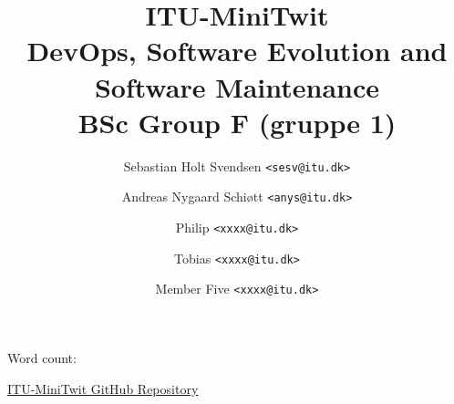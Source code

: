 \documentclass[a4paper,11pt]{article}
\title{
    \textbf{ITU-MiniTwit} \\[0.5em]
    \large DevOps, Software Evolution and Software Maintenance \\
    BSc Group F (gruppe 1)
}
\author{
    Sebastian Holt Svendsen \texttt{<sesv@itu.dk>} \and 
    Andreas Nygaard Schiøtt \texttt{<anys@itu.dk>} \and
    Philip \texttt{<xxxx@itu.dk>} \and
    Tobias \texttt{<xxxx@itu.dk>} \and
    Member Five \texttt{<xxxx@itu.dk>}
}
\begin{document}
\immediate{}

\maketitle
\begin{center}
    \small Word count: \wordcount
\end{center}


\tableofcontents
\vspace{1cm}
\begin{center}
 \href{https://github.com/sebseb10/ITU-MiniTwit}{ITU-MiniTwit GitHub Repository}
\end{center}



\newpage





\end{document}
